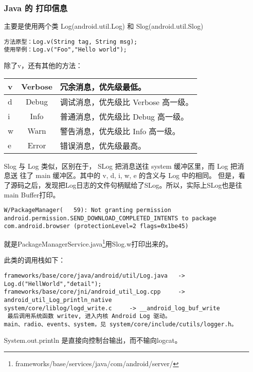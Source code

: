 \documentclass[a4paper,titlepage]{article}
\makeatletter
\newcommand{\tabcaption}{\def\@captype{table}\caption}
\makeatother
\begin{document}
\subsubsection{Java 的 打印信息 }
主要是使用两个类 Log(android.util.Log)
和 Slog(android.util.Slog)
\begin{verbatim}
方法原型：Log.v(String tag, String msg);
使用举例：Log.v("Foo","Hello world");
\end{verbatim}
除了v，还有其他的方法： 
\tabcaption{Log的各种打印方法}
\begin{tabular}{|l|c|l|}\hline
v   &Verbose &冗余消息，优先级最低。 \\\hline
d   &Debug   &调试消息，优先级比 Verbose 高一级。 \\\hline
i   &Info    &普通消息，优先级比 Debug 高一级。 \\\hline
w   &Warn    &警告消息，优先级比 Info 高一级。 \\\hline
e   &Error   &错误消息，优先级最高。 \\\hline
\end{tabular}

Slog 与 Log 类似，区别在于， SLog 把消息送往 system 缓冲区里，而 Log 把消息送
往了 main 缓冲区。其中的 v, d, i, w, e 的含义与 Log 中的相同。
但是，看了源码之后，发现把Log日志的文件句柄赋给了SLog。所以，实际上SLog也是往
main Buffer打印。

\begin{lstlisting} 
W/PackageManager(   59): Not granting permission android.permission.SEND_DOWNLOAD_COMPLETED_INTENTS to package com.android.browser (protectionLevel=2 flags=0x1be45) 
\end{lstlisting}
就是PackageManagerService.java\footnote{frameworks/base/services/java/com/android/server/}用Slog.w打印出来的。


此类的调用栈如下： 
\begin{verbatim}
frameworks/base/core/java/android/util/Log.java   -> Log.d("HellWorld","detail"); 
frameworks/base/core/jni/android_util_Log.cpp     -> android_util_Log_println_native 
system/core/liblog/logd_write.c     -> __android_log_buf_write 
 最后调用系统函数 writev, 进入内核 Android Log 驱动。
main、radio、events、system，见 system/core/include/cutils/logger.h。
\end{verbatim}

System.out.println 是直接向控制台输出，而不输向logcat。
\end{document}
